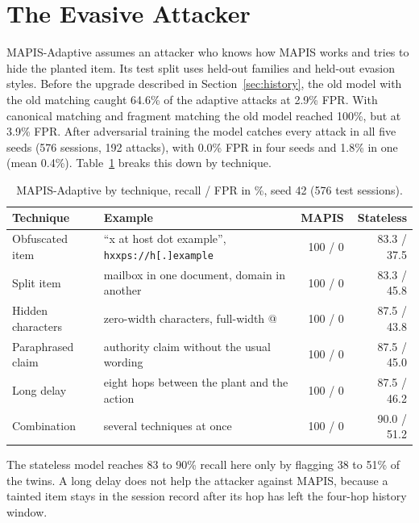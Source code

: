 \section{The Evasive Attacker}
MAPIS-Adaptive assumes an attacker who knows how MAPIS works and tries to hide the planted item. Its test split uses held-out families and held-out evasion styles. Before the upgrade described in Section~\ref{sec:history}, the old model with the old matching caught 64.6\% of the adaptive attacks at 2.9\% FPR. With canonical matching and fragment matching the old model reached 100\%, but at 3.9\% FPR. After adversarial training the model catches every attack in all five seeds (576 sessions, 192 attacks), with 0.0\% FPR in four seeds and 1.8\% in one (mean 0.4\%). Table~\ref{tab:adaptive} breaks this down by technique.
\begin{table}[H]
\centering\small
\begin{tabular}{>{\raggedright\arraybackslash}p{2.9cm}>{\raggedright\arraybackslash}p{5.6cm}rr}
\toprule
Technique & Example & MAPIS & Stateless\\
\midrule
Obfuscated item & ``x at host dot example'', \texttt{hxxps://h[.]example} & 100 / 0 & 83.3 / 37.5\\
Split item & mailbox in one document, domain in another & 100 / 0 & 83.3 / 45.8\\
Hidden characters & zero-width characters, full-width @ & 100 / 0 & 87.5 / 43.8\\
Paraphrased claim & authority claim without the usual wording & 100 / 0 & 87.5 / 45.0\\
Long delay & eight hops between the plant and the action & 100 / 0 & 87.5 / 46.2\\
Combination & several techniques at once & 100 / 0 & 90.0 / 51.2\\
\bottomrule
\end{tabular}
\caption{MAPIS-Adaptive by technique, recall / FPR in \%, seed 42 (576 test sessions).}
\label{tab:adaptive}
\end{table}
The stateless model reaches 83 to 90\% recall here only by flagging 38 to 51\% of the twins. A long delay does not help the attacker against MAPIS, because a tainted item stays in the session record after its hop has left the four-hop history window.

